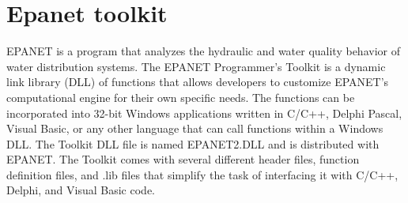 \chapter{Epanet toolkit}

EPANET is a program that analyzes the hydraulic and water quality behavior of
water distribution systems. The EPANET Programmer's Toolkit is a dynamic link 
library (DLL) of functions that allows developers to customize EPANET's computational 
engine for their own specific needs. The functions can be incorporated into 32-bit Windows 
applications written in C/C++, Delphi Pascal, Visual Basic, or any other language that can 
call functions within a Windows DLL. The Toolkit DLL file is named EPANET2.DLL and is 
distributed with EPANET. The Toolkit comes with several different header files, 
function definition files, and .lib files that simplify the task of interfacing 
it with C/C++, Delphi, and Visual Basic code.



